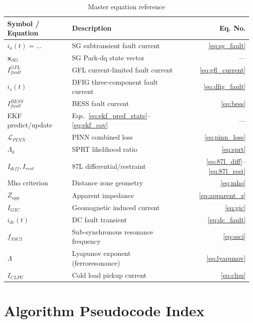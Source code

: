 \documentclass[11pt,a4paper]{report}
\newcommand{\bvec}[1]{\mathbf{#1}}
\begin{document}
\begin{table}[ht]
\centering
\caption{Master equation reference}
\begin{tabular}{llr}
\toprule
Symbol / Equation & Description & Eq. No. \\
\midrule
$i_a(t) = \ldots$ & SG subtransient fault current & \ref{eq:sg_fault} \\
$\bvec{x}_{SG}$ & SG Park-dq state vector & --- \\
$I_{fault}^{GFL}$ & GFL current-limited fault current & \ref{eq:gfl_current} \\
$i_s(t)$ & DFIG three-component fault current & \ref{eq:dfig_fault} \\
$I_{fault}^{BESS}$ & BESS fault current & \ref{eq:bess} \\
EKF predict/update & Eqs.~\ref{eq:ekf_pred_state}--\ref{eq:ekf_cov} & --- \\
$\mathcal{L}_{PINN}$ & PINN combined loss & \ref{eq:pinn_loss} \\
$\Lambda_k$ & SPRT likelihood ratio & \ref{eq:sprt} \\
$I_{diff}, I_{rest}$ & 87L differential/restraint & \ref{eq:87l_diff}--\ref{eq:87l_rest} \\
Mho criterion & Distance zone geometry & \ref{eq:mho} \\
$Z_{app}$ & Apparent impedance & \ref{eq:apparent_z} \\
$I_{GIC}$ & Geomagnetic induced current & \ref{eq:gic} \\
$i_{dc}(t)$ & DC fault transient & \ref{eq:dc_fault} \\
$f_{SSCI}$ & Sub-synchronous resonance frequency & \ref{eq:ssci} \\
$\Lambda$ & Lyapunov exponent (ferroresonance) & \ref{eq:lyapunov} \\
$I_{CLPU}$ & Cold load pickup current & \ref{eq:clpu} \\
\bottomrule
\end{tabular}
\end{table}

\chapter{Algorithm Pseudocode Index}
\label{app:algorithms}
\end{document}
